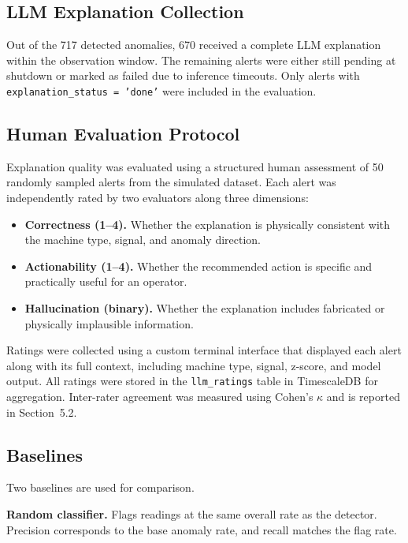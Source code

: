 \documentclass[11pt, a4paper]{article}
\begin{document}
\subsection{LLM Explanation Collection}

Out of the 717 detected anomalies, 670 received a complete LLM 
explanation within the observation window. The remaining alerts were 
either still pending at shutdown or marked as failed due to inference 
timeouts. Only alerts with \texttt{explanation\_status = 'done'} were 
included in the evaluation.

\subsection{Human Evaluation Protocol}

Explanation quality was evaluated using a structured human assessment 
of 50 randomly sampled alerts from the simulated dataset. Each alert 
was independently rated by two evaluators along three dimensions:

\begin{itemize}
    \item \textbf{Correctness (1--4).} Whether the explanation is 
    physically consistent with the machine type, signal, and anomaly 
    direction.

    \item \textbf{Actionability (1--4).} Whether the recommended action 
    is specific and practically useful for an operator.

    \item \textbf{Hallucination (binary).} Whether the explanation 
    includes fabricated or physically implausible information.
\end{itemize}

Ratings were collected using a custom terminal interface that displayed 
each alert along with its full context, including machine type, signal, 
z-score, and model output. All ratings were stored in the 
\texttt{llm\_ratings} table in TimescaleDB for aggregation. Inter-rater 
agreement was measured using Cohen's $\kappa$ and is reported in 
Section~5.2.

\subsection{Baselines}

Two baselines are used for comparison.

\textbf{Random classifier.} Flags readings at the same overall rate as 
the detector. Precision corresponds to the base anomaly rate, and recall 
matches the flag rate.
\end{document}
